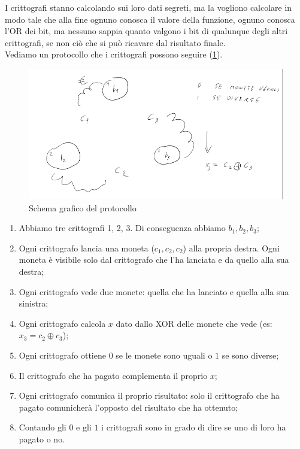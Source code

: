 \noindent I crittografi stanno calcolando sui loro dati segreti, ma la vogliono calcolare in modo tale che alla fine ognuno conosca il valore della funzione, ognuno conosca l'OR dei bit, ma nessuno sappia quanto valgono i bit di qualunque degli altri crittografi, se non ciò che si può ricavare dal risultato finale. 
\\

\noindent Vediamo un protocollo che i crittografi possono seguire (\ref{fig:12-3}).
\begin{figure}
    \centering
    \includegraphics[width=1\textwidth]{images/12-3.png}
    \caption{Schema grafico del protocollo}
    \label{fig:12-3}
\end{figure}
\begin{enumerate}
    \item Abbiamo tre crittografi 1, 2, 3. Di conseguenza abbiamo $b_1, b_2, b_3$;
    \item Ogni crittografo lancia una moneta ($c_1, c_2, c_2$) alla propria destra. Ogni moneta è visibile solo dal crittografo che l'ha lanciata e da quello alla sua destra;
    \item Ogni crittografo vede due monete: quella che ha lanciato e quella alla sua sinistra;
    \item Ogni crittografo calcola $x$ dato dallo XOR delle monete che vede (es: $x_3 = c_2 \oplus c_3$);
    \item Ogni crittografo ottiene $0$ se le monete sono uguali o $1$ se sono diverse;
    \item Il crittografo che ha pagato complementa il proprio $x$;
    \item Ogni crittografo comunica il proprio risultato: solo il crittografo che ha pagato comunicherà l'opposto del risultato che ha ottenuto;
    \item Contando gli $0$ e gli $1$ i crittografi sono in grado di dire se uno di loro ha pagato o no.
\end{enumerate}

